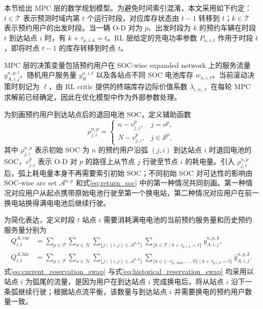 \documentclass[12pt,hyperref,a4paper,UTF8]{ctexart}
\begin{document}
本节给出 MPC 层的数学规划模型。为避免时间索引混淆，本文采用如下约定：$t\in\mathcal{T}$ 表示预测时域内第 $t$ 个运行时段，对应库存状态由 $t-1$ 转移到 $t$；$k\in\mathcal{T}$ 表示预约用户的出发时段。当一辆 O-D 对为 $p$、出发时段为 $k$ 的预约车辆在时段 $t$ 到达站点 $i$ 时，有 $k+\tau_{p,i,k}=t$。RL 层给定的充电功率参数 $P_{n,i,t}$ 作用于时段 $t$，即将时点 $t-1$ 的库存转移到时点 $t$。

MPC 层的决策变量包括预约用户在 SOC-wise expanded network 上的服务流量 $y_{A,i,j}^{n,p,t}$、随机用户服务量 $y_R^{n,i,t}$ 以及各站点不同 SOC 电池库存 $w_{n,i,t}$。当前滚动决策时刻记为 $\ell$，由 RL critic 提供的终端库存边际价值系数 $\lambda_{i,n,\ell}$ 在每轮 MPC 求解前已经确定，因此在优化模型中作为外部参数处理。

为刻画预约用户到达站点后的退回电池 SOC，定义辅助函数
\begin{equation}
\rho_{j,i}^{n,p}=
\begin{cases}
 n-v_{j,i}^{p}, & j=o^p,\\
 N-v_{j,i}^{p}, & j\in\mathcal{S}^{p},
\end{cases}
\label{eq:return_soc}
\end{equation}
其中 $\rho_{j,i}^{n,p}$ 表示初始 SOC 为 $n$ 的预约用户沿弧 $(j,i)$ 到达站点 $i$ 时退回电池的 SOC，$v_{j,i}^{p}$ 表示 O-D 对 $p$ 的路径上从节点 $j$ 行驶至节点 $i$ 的耗电量。引入 $\rho_{j,i}^{n,p}$ 后，弧上耗电量本身不再需要索引初始 SOC；不同初始 SOC 对可达性的影响由 SOC-wise arc set $\mathcal{A}^{n,p}$ 和式\eqref{eq:return_soc} 中的第一种情况共同刻画。第一种情况对应用户从起点携带原始电池行驶至第一个换电站，第二种情况对应用户在前一换电站换得满电电池后继续行驶。

为简化表达，定义时段 $t$ 站点 $i$ 需要消耗满电电池的当前预约服务量和历史预约服务量分别为
\begin{align}
Q_{i,t}^{A,\mathrm{cur}}
&=
\sum_{p\in\mathcal{P}}
\sum_{n\in\mathcal{N}}
\sum_{\{j\mid (i,j)\in\mathcal{A}^{n,p}\}}
\sum_{\{k\in\mathcal{T}\mid k+\tau_{p,i,k}=t\}}
y_{A,i,j}^{n,p,k},
\label{eq:current_reservation_swap}\\
Q_{i,t}^{A,\mathrm{his}}
&=
\sum_{p\in\mathcal{P}}
\sum_{n\in\mathcal{N}}
\sum_{\{j\mid (i,j)\in\mathcal{A}^{n,p}\}}
\sum_{\{k\in\{-\tau_{p,\max},\ldots,0\}\mid k+\tau_{p,i,k}=t\}}
\bar{y}_{A,i,j}^{n,p,k}.
\label{eq:historical_reservation_swap}
\end{align}
式\eqref{eq:current_reservation_swap} 与式\eqref{eq:historical_reservation_swap} 均采用以站点 $i$ 为弧尾的流量，是因为用户在到达站点 $i$ 完成换电后，将从站点 $i$ 沿下一条弧继续行驶；根据站点流平衡，该数量与到达站点 $i$ 并需要换电的预约用户数量一致。
\end{document}

